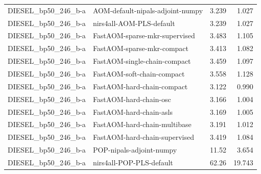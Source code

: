 \begin{landscape}
\begin{longtable}{L{8.0cm}L{9.5cm}rr}
DIESEL\_\allowbreak{}bp50\_\allowbreak{}246\_\allowbreak{}b-\allowbreak{}a & AOM-\allowbreak{}default-\allowbreak{}nipals-\allowbreak{}adjoint-\allowbreak{}numpy & 3.239 & 1.027 \\
DIESEL\_\allowbreak{}bp50\_\allowbreak{}246\_\allowbreak{}b-\allowbreak{}a & nirs4all-\allowbreak{}AOM-\allowbreak{}PLS-\allowbreak{}default & 3.239 & 1.027 \\
DIESEL\_\allowbreak{}bp50\_\allowbreak{}246\_\allowbreak{}b-\allowbreak{}a & FastAOM-\allowbreak{}sparse-\allowbreak{}mkr-\allowbreak{}supervised & 3.483 & 1.105 \\
DIESEL\_\allowbreak{}bp50\_\allowbreak{}246\_\allowbreak{}b-\allowbreak{}a & FastAOM-\allowbreak{}sparse-\allowbreak{}mkr-\allowbreak{}compact & 3.413 & 1.082 \\
DIESEL\_\allowbreak{}bp50\_\allowbreak{}246\_\allowbreak{}b-\allowbreak{}a & FastAOM-\allowbreak{}single-\allowbreak{}chain-\allowbreak{}compact & 3.459 & 1.097 \\
DIESEL\_\allowbreak{}bp50\_\allowbreak{}246\_\allowbreak{}b-\allowbreak{}a & FastAOM-\allowbreak{}soft-\allowbreak{}chain-\allowbreak{}compact & 3.558 & 1.128 \\
DIESEL\_\allowbreak{}bp50\_\allowbreak{}246\_\allowbreak{}b-\allowbreak{}a & FastAOM-\allowbreak{}hard-\allowbreak{}chain-\allowbreak{}compact & 3.122 & 0.990 \\
DIESEL\_\allowbreak{}bp50\_\allowbreak{}246\_\allowbreak{}b-\allowbreak{}a & FastAOM-\allowbreak{}hard-\allowbreak{}chain-\allowbreak{}osc & 3.166 & 1.004 \\
DIESEL\_\allowbreak{}bp50\_\allowbreak{}246\_\allowbreak{}b-\allowbreak{}a & FastAOM-\allowbreak{}hard-\allowbreak{}chain-\allowbreak{}asls & 3.169 & 1.005 \\
DIESEL\_\allowbreak{}bp50\_\allowbreak{}246\_\allowbreak{}b-\allowbreak{}a & FastAOM-\allowbreak{}hard-\allowbreak{}chain-\allowbreak{}multibase & 3.191 & 1.012 \\
DIESEL\_\allowbreak{}bp50\_\allowbreak{}246\_\allowbreak{}b-\allowbreak{}a & FastAOM-\allowbreak{}hard-\allowbreak{}chain-\allowbreak{}supervised & 3.419 & 1.084 \\
DIESEL\_\allowbreak{}bp50\_\allowbreak{}246\_\allowbreak{}b-\allowbreak{}a & POP-\allowbreak{}nipals-\allowbreak{}adjoint-\allowbreak{}numpy & 11.52 & 3.654 \\
DIESEL\_\allowbreak{}bp50\_\allowbreak{}246\_\allowbreak{}b-\allowbreak{}a & nirs4all-\allowbreak{}POP-\allowbreak{}PLS-\allowbreak{}default & 62.26 & 19.743 \\

\end{longtable}
\end{landscape}
